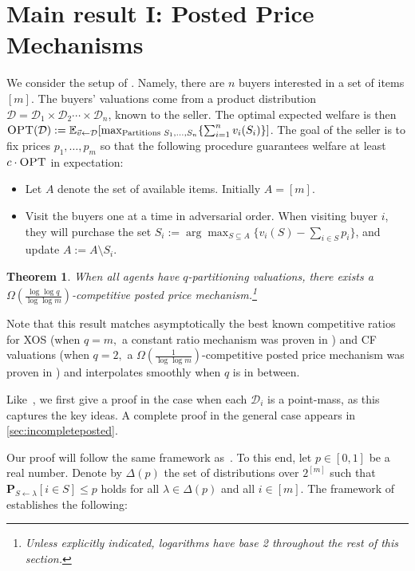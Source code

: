 \documentclass[11pt]{article}\usepackage{amsfonts}
\newtheorem{theorem}{Theorem}
\numberwithin{theorem}{subsection}
\newcommand{\prob}{\mathbf{P}}
\begin{document}
\section{Main result I: Posted Price Mechanisms}\label{section:postedprices}
We consider the setup of \cite{FeldmanGL15}. Namely, there are $n$ buyers interested in a set of items $[m].$ The buyers' valuations come from a product distribution $\mathcal{D} = \mathcal{D}_1\times \mathcal{D}_2\cdots\times\mathcal{D}_n$, known to the seller. The optimal expected welfare is then $\textsc{OPT}(\mathcal{D}):=\mathbb{E}_{\vec{v} \leftarrow \mathcal{D}}[\max_{\text{Partitions } S_1,\ldots, S_n}\{\sum_{i=1}^n v_i(S_i)\}]$. The goal of the seller is to fix prices $p_1,\ldots, p_m$ so that the following procedure guarantees welfare at least $c\cdot \textsc{OPT}$ in expectation:
\begin{itemize}
\item Let $A$ denote the set of available items. Initially $A = [m]$.
\item Visit the buyers one at a time in adversarial order. When visiting buyer $i$, they will purchase the set $S_i:=\arg\max_{S \subseteq A}\{v_i(S) - \sum_{i \in S} p_i\}$, and update $A:=A \setminus S_i$. 
\end{itemize}

\begin{theorem}
\label{thm:postedpriceqpart}
    When all agents have $q$-partitioning valuations, there exists a
    $\Omega(\frac{\log \log q}{\log \log m})$-competitive
    posted price mechanism.\footnote{Unless explicitly indicated, logarithms have base 2 throughout the rest of this section.}
\end{theorem}

Note that this result matches asymptotically the best known competitive ratios for XOS (when $q = m,$ a constant ratio mechanism was proven in \cite{FeldmanGL15}) and CF valuations (when $q = 2,$ a $\Omega(\frac{1}{\log \log m})$-competitive posted price mechanism was proven in \cite{DuttingKL20}) and interpolates smoothly when $q$ is in between.

Like~\cite{DuttingKL20}, we first give a proof in the case when each $\mathcal{D}_i$ is a point-mass, as this captures the key ideas. A complete proof in the general case appears in \cref{sec:incompleteposted}.

Our proof will follow the same framework as~\cite{DuttingKL20}. To this end, let $p \in [0,1]$ be a real number. Denote by $\Delta(p)$ the set of distributions over $2^{[m]}$ such that $\prob_{S\leftarrow \lambda}[i \in S]\le p$ holds for all $\lambda \in \Delta(p)$ and all 
$i \in [m]$. The framework of~\cite{DuttingKL20} establishes the following:
\end{document}
